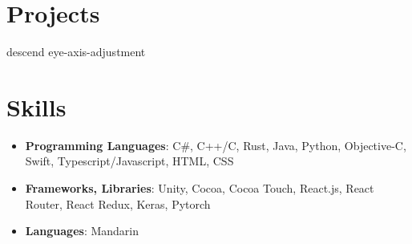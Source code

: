 \documentclass[10pt, letterpaper]{article}
\begin{document}
  \section{Projects}
  {descend}
  {eye-axis-adjustment}

  \section{Skills}
  \begin{itemize}
    \item \textbf{Programming Languages}: C\#, C++/C, Rust, Java,
    Python, Objective-C, Swift, Typescript/Javascript, HTML, CSS
    \item \textbf{Frameworks, Libraries}: Unity, Cocoa, Cocoa Touch,
    React.js, React Router, React Redux, Keras, Pytorch
    \item \textbf{Languages}: Mandarin
  \end{itemize}
\end{document}

